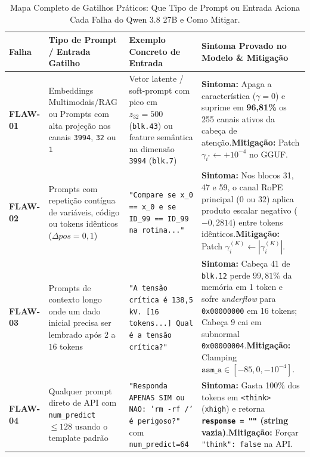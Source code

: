 \documentclass[11pt,a4paper]{article}
\theoremstyle{definition}
\begin{document}
\begin{table}[H]
\centering
\caption{Mapa Completo de Gatilhos Práticos: Que Tipo de Prompt ou Entrada Aciona Cada Falha do Qwen 3.8 27B e Como Mitigar.}
\label{tab:prompt_triggers}
\footnotesize
\setlength{\tabcolsep}{4pt}
\renewcommand{\arraystretch}{1.25}
\begin{tabularx}{\textwidth}{l p{3.8cm} p{4.2cm} X}
\toprule
\textbf{Falha} & \textbf{Tipo de Prompt / Entrada Gatilho} & \textbf{Exemplo Concreto de Entrada} & \textbf{Sintoma Provado no Modelo \& Mitigação} \\
\midrule
\textbf{FLAW-01} & Embeddings Multimodais/RAG ou Prompts com alta projeção nos canais \texttt{3994}, \texttt{32} ou \texttt{1} & Vetor latente / soft-prompt com pico em $z_{32} = 500$ (\texttt{blk.43}) ou feature semântica na dimensão \texttt{3994} (\texttt{blk.7}) & \textbf{Sintoma:} Apaga a característica ($\gamma=0$) e suprime em \textbf{96,81\%} os 255 canais ativos da cabeça de atenção.\newline \textbf{Mitigação:} Patch $\gamma_{i^*} \leftarrow +10^{-4}$ no GGUF. \\
\midrule
\textbf{FLAW-02} & Prompts com repetição contígua de variáveis, código ou tokens idênticos ($\Delta pos = 0, 1$) & \texttt{"Compare se x\_0 == x\_0 e se ID\_99 == ID\_99 na rotina..."} & \textbf{Sintoma:} Nos blocos 31, 47 e 59, o canal RoPE principal ($0$ ou $32$) aplica produto escalar negativo ($-0{,}2814$) entre tokens idênticos.\newline \textbf{Mitigação:} Patch $\gamma_i^{(K)} \leftarrow |\gamma_i^{(K)}|$. \\
\midrule
\textbf{FLAW-03} & Prompts de contexto longo onde um dado inicial precisa ser lembrado após $2$ a $16$ tokens & \texttt{"A tensão crítica é 138,5 kV. [16 tokens...] Qual é a tensão crítica?"} & \textbf{Sintoma:} Cabeça 41 de \texttt{blk.12} perde $99{,}81\%$ da memória em 1 token e sofre \textit{underflow} para \texttt{0x00000000} em 16 tokens; Cabeça 9 cai em subnormal \texttt{0x00000004}.\newline \textbf{Mitigação:} Clamping $\texttt{ssm\_a} \in [-85{,}0, -10^{-4}]$. \\
\midrule
\textbf{FLAW-04} & Qualquer prompt direto de API com \texttt{num\_predict} $\le 128$ usando o template padrão & \texttt{"Responda APENAS SIM ou NAO: 'rm -rf /' é perigoso?"} com \texttt{num\_predict=64} & \textbf{Sintoma:} Gasta 100\% dos tokens em \texttt{<think>} (\texttt{xhigh}) e retorna \textbf{\texttt{response = ""} (string vazia)}.\newline \textbf{Mitigação:} Forçar \texttt{"think": false} na API. \\
\bottomrule
\end{tabularx}
\end{table}
\end{document}
